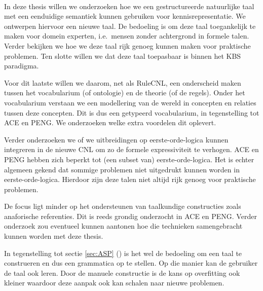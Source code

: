 \paragraph{} In deze thesis willen we onderzoeken hoe we een gestructureerde natuurlijke taal met een eenduidige semantiek kunnen gebruiken voor kennisrepresentatie. We ontwerpen hiervoor een nieuwe taal. De bedoeling is om deze taal toegankelijk te maken voor domein experten, i.e.\ mensen zonder achtergrond in formele talen. Verder bekijken we hoe we deze taal rijk genoeg kunnen maken voor praktische problemen. Ten slotte willen we dat deze taal toepasbaar is binnen het KBS paradigma.

Voor dit laatste willen we daarom, net als RuleCNL, een onderscheid maken tussen het vocabularium (of ontologie) en de theorie (of de regels). Onder het vocabularium verstaan we een modellering van de wereld in concepten en relaties tussen deze concepten. Dit is dus een getypeerd vocabularium, in tegenstelling tot ACE en PENG. We onderzoeken welke extra voordelen dit oplevert. 

Verder onderzoeken we of we uitbreidingen op eerste-orde-logica kunnen integreren in de nieuwe CNL om zo de formele expressiviteit te verhogen. ACE en PENG hebben zich beperkt tot (een subset van) eerste-orde-logica. Het is echter algemeen gekend dat sommige problemen niet uitgedrukt kunnen worden in eerste-orde-logica. Hierdoor zijn deze talen niet altijd rijk genoeg voor praktische problemen.

De focus ligt minder op het ondersteunen van taalkundige constructies zoals anaforische referenties. Dit is reeds grondig onderzocht in ACE en PENG. Verder onderzoek zou eventueel kunnen aantonen hoe die technieken samengebracht kunnen worden met deze thesis.

In tegenstelling tot sectie \ref{sec:ASP} () is het wel de bedoeling om een taal te construeren en dus een grammatica op te stellen. Op die manier kan de gebruiker de taal ook leren. Door de manuele constructie is de kans op overfitting ook kleiner waardoor deze aanpak ook kan schalen naar nieuwe problemen.
